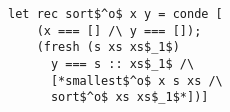 \begin{figure}[h]
  \centering
  \begin{minipage}{0.87\columnwidth}
    \begin{lstlisting}[frame=tb]
 let rec sort$^o$ x y = conde [
    (x === [] /\ y === []);
    (fresh (s xs xs$_1$)
      y === s :: xs$_1$ /\
      [*smallest$^o$ x s xs /\
      sort$^o$ xs xs$_1$*])]
    \end{lstlisting}
  \end{minipage}
\end{figure}
